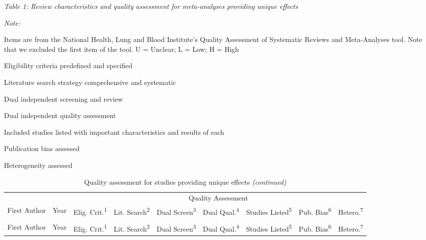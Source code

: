 \documentclass[
  english,
  man]{apa6}
\begin{document}
\emph{Table 1: Review characteristics and quality assessment for meta-analyses providing unique effects}

\begin{ThreePartTable}
\begin{TableNotes}
\item \textit{Note: } 
\item Items are from the National Health, Lung and Blood Institute's Quality Assessment of Systematic Reviews and Meta-Analyses tool. Note that we excluded the first item of the tool. U = Unclear; L = Low; H = High
\item[1] Eligibility criteria predefined and specified
\item[2] Literature search strategy comprehensive and systematic
\item[3] Dual independent screening and review
\item[4] Dual independent quality assessment
\item[5] Included studies listed with important characteristics and results of each
\item[6] Publication bias assessed
\item[7] Heterogeneity assessed
\end{TableNotes}
\begin{longtable}[t]{ll>{\centering\arraybackslash}p{1.25cm}>{\centering\arraybackslash}p{1.25cm}>{\centering\arraybackslash}p{1.25cm}>{\centering\arraybackslash}p{1.25cm}>{\centering\arraybackslash}p{1.25cm}>{\centering\arraybackslash}p{1.25cm}>{\centering\arraybackslash}p{1.25cm}}
\caption{Quality assessment for studies providing unique effects}\\
\toprule
\multicolumn{2}{c}{ } & \multicolumn{7}{c}{Quality Assessment} \\
\cmidrule(l{3pt}r{3pt}){3-9}
First Author & Year & Elig. Crit.\textsuperscript{1} & Lit. Search\textsuperscript{2} & Dual Screen\textsuperscript{3} & Dual Qual.\textsuperscript{4} & Studies Listed\textsuperscript{5} & Pub. Bias\textsuperscript{6} & Hetero.\textsuperscript{7}\\
\midrule
\endfirsthead
\caption[]{Quality assessment for studies providing unique effects \textit{(continued)}}\\
\toprule
First Author & Year & Elig. Crit.\textsuperscript{1} & Lit. Search\textsuperscript{2} & Dual Screen\textsuperscript{3} & Dual Qual.\textsuperscript{4} & Studies Listed\textsuperscript{5} & Pub. Bias\textsuperscript{6} & Hetero.\textsuperscript{7}\\
\midrule
\endhead


\end{longtable}
\end{ThreePartTable}
\end{document}
